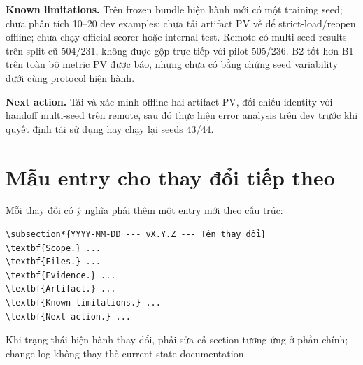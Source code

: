 \documentclass[11pt,a4paper]{article}
\begin{document}
\textbf{Known limitations.} Trên frozen bundle hiện hành mới có một training seed; chưa phân tích 10--20 dev examples; chưa tải artifact PV về để strict-load/reopen offline; chưa chạy official scorer hoặc internal test. Remote có multi-seed results trên split cũ 504/231, không được gộp trực tiếp với pilot 505/236. B2 tốt hơn B1 trên toàn bộ metric PV được báo, nhưng chưa có bằng chứng seed variability dưới cùng protocol hiện hành.

\textbf{Next action.} Tải và xác minh offline hai artifact PV, đối chiếu identity với handoff multi-seed trên remote, sau đó thực hiện error analysis trên dev trước khi quyết định tái sử dụng hay chạy lại seeds 43/44.

\appendix
\section{Mẫu entry cho thay đổi tiếp theo}

Mỗi thay đổi có ý nghĩa phải thêm một entry mới theo cấu trúc:
\begin{verbatim}
\subsection*{YYYY-MM-DD --- vX.Y.Z --- Tên thay đổi}
\textbf{Scope.} ...
\textbf{Files.} ...
\textbf{Evidence.} ...
\textbf{Artifact.} ...
\textbf{Known limitations.} ...
\textbf{Next action.} ...
\end{verbatim}

Khi trạng thái hiện hành thay đổi, phải sửa cả section tương ứng ở phần chính; change log không thay thế current-state documentation.
\end{document}
